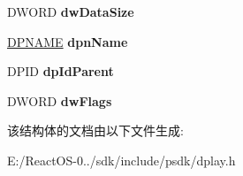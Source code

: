 \begin{DoxyCompactItemize}
D\+W\+O\+RD {\bfseries dw\+Data\+Size}
\item 
\mbox{\label{structtag_d_p_m_s_g___c_r_e_a_t_e_p_l_a_y_e_r_o_r_g_r_o_u_p_ad743add8a146161e4de16d09688e38ce}} 
\hyperlink{structtag_d_p_n_a_m_e}{D\+P\+N\+A\+ME} {\bfseries dpn\+Name}
\item 
\mbox{\label{structtag_d_p_m_s_g___c_r_e_a_t_e_p_l_a_y_e_r_o_r_g_r_o_u_p_a9ce5ea32d764faa65cca8b211b4ac3b3}} 
D\+P\+ID {\bfseries dp\+Id\+Parent}
\item 
\mbox{\label{structtag_d_p_m_s_g___c_r_e_a_t_e_p_l_a_y_e_r_o_r_g_r_o_u_p_a56a624dabe75988e1553f2fedbc6d5d8}} 
D\+W\+O\+RD {\bfseries dw\+Flags}
\end{DoxyCompactItemize}


该结构体的文档由以下文件生成\+:\begin{DoxyCompactItemize}
\item 
E\+:/\+React\+O\+S-\/0../sdk/include/psdk/dplay.\+h\end{DoxyCompactItemize}
